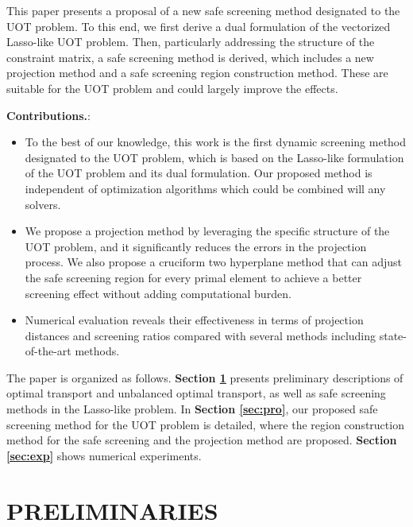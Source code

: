 \documentclass[twoside]{article}
\theoremstyle{plain}
\begin{document}
This paper presents a proposal of a new safe screening method designated to the UOT problem. To this end, we first derive a dual formulation of the vectorized Lasso-like UOT problem. Then, particularly addressing the structure of the constraint matrix, a safe screening method is derived, which includes a new projection method and a safe screening region construction method. These are suitable for the UOT problem and could largely improve the effects. 

\textbf{Contributions.}: 
\begin{itemize}
\item To the best of our knowledge, this work is the first dynamic screening method designated to the UOT problem, which is based on the Lasso-like formulation of the UOT problem and its dual formulation. Our proposed method is independent of optimization algorithms which could be combined will any solvers.
\item We propose a projection method by leveraging the specific structure of the UOT problem, and it significantly reduces the errors in the projection process.
We also propose a cruciform two hyperplane method that can adjust the safe screening region for every primal element to achieve a better screening effect without adding computational burden.
\item Numerical evaluation reveals their effectiveness in terms of projection distances and screening ratios compared with several methods including state-of-the-art methods.
\end{itemize}


The paper is organized as follows. {\bf Section \ref{sec:pre}} presents preliminary descriptions of optimal transport and unbalanced optimal transport, as well as safe screening methods in the Lasso-like problem. In {\bf Section \ref{sec:pro}}, our proposed safe screening method for the UOT problem is detailed, where the region construction method for the safe screening and the projection method are proposed. {\bf Section \ref{sec:exp}} shows numerical experiments.

\section{PRELIMINARIES}
\label{sec:pre}
\end{document}
